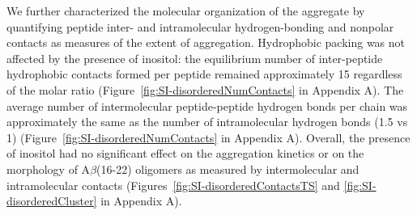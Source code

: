 We further characterized the molecular organization of the aggregate by quantifying peptide inter- and intramolecular hydrogen-bonding and nonpolar contacts as measures of the extent of aggregation.  Hydrophobic packing was not affected by the presence of inositol: the equilibrium number of inter-peptide hydrophobic contacts formed per peptide remained approximately 15 regardless of the molar ratio (Figure~\ref{fig:SI-disorderedNumContacts} in Appendix A). 
The average number of intermolecular peptide-peptide hydrogen bonds per chain was approximately the same as the number of intramolecular hydrogen bonds (1.5 vs 1) (Figure~\ref{fig:SI-disorderedNumContacts} in Appendix A).
Overall, the presence of inositol had no significant effect on the aggregation kinetics or on the morphology of A$\beta$(16-22) oligomers as measured by intermolecular and intramolecular contacts (Figures~\ref{fig:SI-disorderedContactsTS} and \ref{fig:SI-disorderedCluster} in Appendix A).

